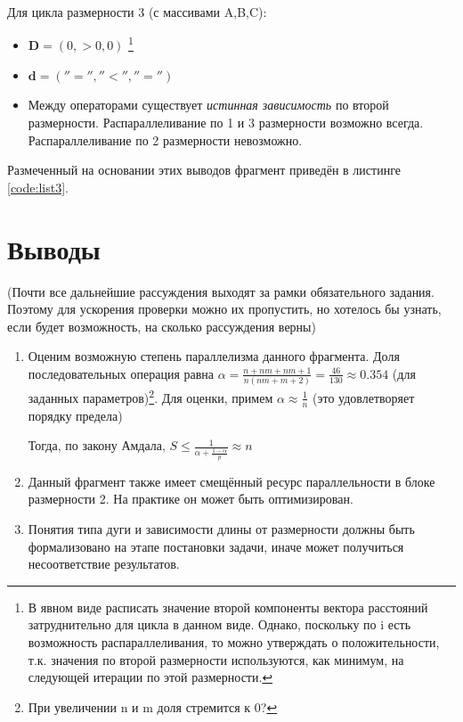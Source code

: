 \documentclass[12pt, fleqn]{article}
\theoremstyle{definition}
\begin{document}
Для цикла размерности 3 (с массивами A,B,C):
\begin{itemize}
 \item $\mathbf{D} = \left(0, >0, 0\right)$ \footnote{В явном виде расписать значение второй компоненты вектора расстояний затруднительно для цикла в данном виде. Однако, поскольку по i есть возможность распараллеливания, то можно утверждать о положительности, т.к. значения по второй размерности используются, как минимум, на следующей итерации по этой размерности.}
 \item $\mathbf{d} = \left(''='', ''<'', ''=''\right)$
 \item Между операторами существует \textit{истинная зависимость} по второй размерности. Распараллеливание по 1 и 3 размерности возможно всегда. Распараллеливание по 2 размерности невозможно.
\end{itemize}

Размеченный на основании этих выводов фрагмент приведён в листинге \ref{code:list3}.
{}
\section{Выводы}
(Почти все дальнейшие рассуждения выходят за рамки обязательного задания. Поэтому для ускорения проверки можно их пропустить, но хотелось бы узнать, если будет возможность, на сколько рассуждения верны)
\begin{enumerate}
 \item Оценим возможную степень параллелизма данного фрагмента. Доля последовательных операция равна $\alpha = \frac{n + nm + nm + 1}{n(nm + m + 2)} = \frac{46}{130} \approx 0.354$ (для заданных параметров)\footnote{При увеличении n и m доля стремится к 0?}. Для оценки, примем $\alpha \approx \frac{1}{n}$ (это удовлетворяет порядку предела)
 
 Тогда, по закону Амдала, $S \leq \frac{1}{\alpha + \frac{1-\alpha}{p}} \approx n$
 \item Данный фрагмент также имеет смещённый ресурс параллельности в блоке размерности 2. На практике он может быть оптимизирован.
 \item Понятия типа дуги и зависимости длины от размерности должны быть формализовано на этапе постановки задачи, иначе может получиться несоответствие результатов.
\end{enumerate}
\end{document}
